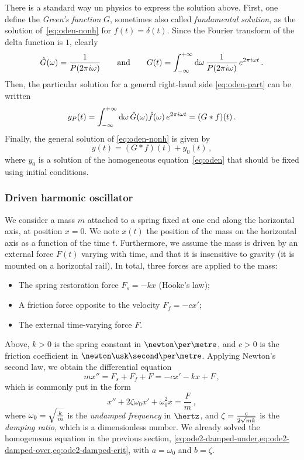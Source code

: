 There is a standard way un physics to express the solution above. First, one define the
\emph{Green's function} $G$, sometimes also called \emph{fundamental solution}, as the
solution of~\cref{eq:oden-nonh} for $f(t)=\delta(t)$. Since the Fourier transform of the
delta function is $1$, clearly
\begin{equation}
  \hat{G}(\omega)=\frac{1}{P(2\pi i\omega)}\qquad\text{and}\qquad
  G(t)=\int_{-\infty}^{+\infty}\mathrm{d}{\omega}\,\frac{1}{P(2\pi i\omega)}\,e^{2\pi i \omega t}\,.
  \label{eq:green-ft}
\end{equation}
Then, the particular solution for a general right-hand side \cref{eq:oden-part} can be
written
\begin{equation}
  y_P(t)=\int_{-\infty}^{+\infty}\mathrm{d}{\omega}\,\hat{G}(\omega)\hat{f}(\omega)\,e^{2\pi i\omega t}
  =(G\ast f)(t)\,.
\end{equation}
Finally, the general solution of \cref{eq:oden-nonh} is given by
\begin{equation}
  y(t)=(G\ast f)(t)+y_0(t)\,,
\end{equation}
where $y_0$ is a solution of the homogeneous equation~\cref{eq:oden} that should be fixed
using initial conditions.
\subsubsection{Driven harmonic oscillator}
We consider a mass $m$ attached to a spring fixed at one end along the horizontal axis, at
position $x=0$. We note $x(t)$ the position of the mass on the horizontal axis as a
function of the time $t$. Furthermore, we assume the mass is driven by an external force
$F(t)$ varying with time, and that it is insensitive to gravity (\eg it is mounted on a
horizontal rail). In total, three forces are applied to the mass:
\begin{itemize}
  \item The spring restoration force $F_s=-kx$ (Hooke's law);
  \item A friction force opposite to the velocity $F_f=-cx'$;
  \item The external time-varying force $F$.
\end{itemize}
Above, $k>0$ is the spring constant in $\newton\per\metre$, and $c>0$ is the friction
coefficient in $\newton\usk\second\per\metre$. Applying Newton's second law, we obtain the
differential equation
\begin{equation}
  mx''=F_s+F_f+F=-cx'-kx+F\,,
\end{equation}
which is commonly put in the form
\begin{equation}
  x''+2\zeta\omega_0x'+\omega_0^2x=\frac{F}{m}\,,\label{eq:ode2-driven}
\end{equation}
where $\omega_0=\smash{\sqrt{\frac{k}{m}}}$ is the \emph{undamped frequency} in $\hertz$,
and $\zeta=\smash{\frac{c}{2\sqrt{mk}}}$ is the \emph{damping ratio}, which is a
dimensionless number. We already solved the homogeneous equation in the previous section,
\cf \cref{eq:ode2-damped-under,eq:ode2-damped-over,eq:ode2-damped-crit}, with $a=\omega_0$
and $b=\zeta$.

